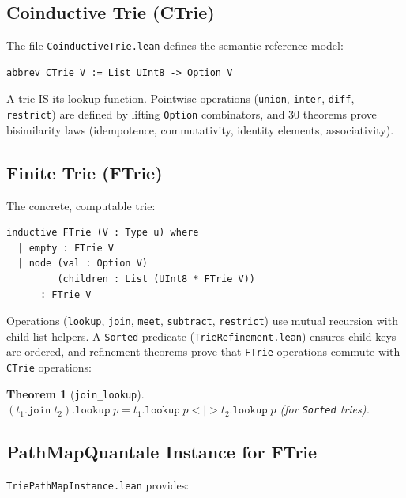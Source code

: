 \documentclass[11pt]{article}
\newtheorem{theorem}{Theorem}[section]
\theoremstyle{definition}
\theoremstyle{remark}
\begin{document}
\subsection{Coinductive Trie (CTrie)}

The file \texttt{CoinductiveTrie.lean} defines the semantic reference model:

\begin{lstlisting}[caption={Coinductive trie (\texttt{CoinductiveTrie.lean}).}]
abbrev CTrie V := List UInt8 -> Option V
\end{lstlisting}

\noindent
A trie IS its lookup function.
Pointwise operations (\texttt{union}, \texttt{inter}, \texttt{diff},
\texttt{restrict}) are defined by lifting \texttt{Option} combinators, and
30 theorems prove bisimilarity laws (idempotence, commutativity, identity
elements, associativity).

\subsection{Finite Trie (FTrie)}

The concrete, computable trie:

\begin{lstlisting}[caption={Finite trie (\texttt{FiniteTrie.lean}).}]
inductive FTrie (V : Type u) where
  | empty : FTrie V
  | node (val : Option V)
         (children : List (UInt8 * FTrie V))
      : FTrie V
\end{lstlisting}

\noindent
Operations (\texttt{lookup}, \texttt{join}, \texttt{meet}, \texttt{subtract},
\texttt{restrict}) use mutual recursion with child-list helpers.
A \texttt{Sorted} predicate (\texttt{TrieRefinement.lean}) ensures child
keys are ordered, and refinement theorems prove that \texttt{FTrie}
operations commute with \texttt{CTrie} operations:

\begin{theorem}[\texttt{join\_lookup}]
$(t_1.\mathtt{join}\;t_2).\mathtt{lookup}\;p
  = t_1.\mathtt{lookup}\;p \mathbin{<\!|>} t_2.\mathtt{lookup}\;p$
\quad (for \texttt{Sorted} tries).
\end{theorem}

\subsection{PathMapQuantale Instance for FTrie}

\texttt{TriePathMapInstance.lean} provides:
\end{document}
